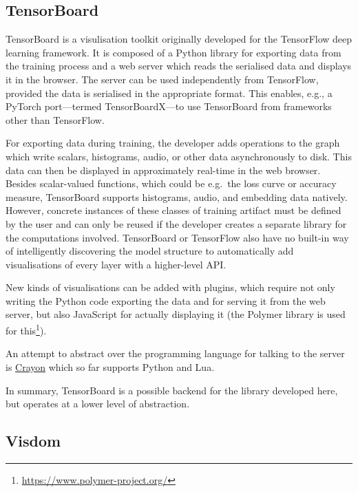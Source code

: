 \hypertarget{tensorboard}{%
\subsection*{TensorBoard}\label{tensorboard}}

TensorBoard is a visulisation toolkit originally developed for the TensorFlow
\citep{tensorflow2015-whitepaper} deep learning framework. It is composed of a
Python library for exporting data from the training process and a web server
which reads the serialised data and displays it in the browser. The server can
be used independently from TensorFlow, provided the data is serialised in the
appropriate format. This enables, e.g., a PyTorch port---termed TensorBoardX---to
use TensorBoard from frameworks other than TensorFlow.

For exporting data during training, the developer adds operations to the
graph which write scalars, histograms, audio, or other data
asynchronously to disk. This data can then be displayed in approximately
real-time in the web browser. Besides scalar-valued functions, which
could be e.g.~the loss curve or accuracy measure, TensorBoard supports
histograms, audio, and embedding data natively. However, concrete
instances of these classes of training artifact must be defined by the
user and can only be reused if the developer creates a separate library
for the computations involved. TensorBoard or TensorFlow also have no built-in
way of intelligently discovering the model structure to automatically add
visualisations of every layer with a higher-level API.

New kinds of visualisations can be added with plugins, which require not
only writing the Python code exporting the data and for serving it from
the web server, but also JavaScript for actually displaying it (the
Polymer library is used for this\footnote{\url{https://www.polymer-project.org/}}).

An attempt to abstract over the programming language for talking to
the server is \href{https://github.com/torrvision/crayon}{Crayon} which
so far supports Python and Lua.

In summary, TensorBoard is a possible backend for the library developed here,
but operates at a lower level of abstraction.

\hypertarget{visdom}{%
\subsection*{Visdom}\label{visdom}}

